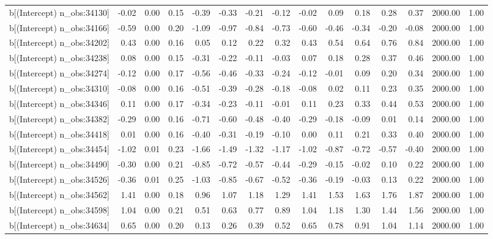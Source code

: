 \begin{table}[ht]
\begin{tabular}{rrrrrrrrrrrrrrr}
  b[(Intercept) n\_obs:34130] & -0.02 & 0.00 & 0.15 & -0.39 & -0.33 & -0.21 & -0.12 & -0.02 & 0.09 & 0.18 & 0.28 & 0.37 & 2000.00 & 1.00 \\ 
  b[(Intercept) n\_obs:34166] & -0.59 & 0.00 & 0.20 & -1.09 & -0.97 & -0.84 & -0.73 & -0.60 & -0.46 & -0.34 & -0.20 & -0.08 & 2000.00 & 1.00 \\ 
  b[(Intercept) n\_obs:34202] & 0.43 & 0.00 & 0.16 & 0.05 & 0.12 & 0.22 & 0.32 & 0.43 & 0.54 & 0.64 & 0.76 & 0.84 & 2000.00 & 1.00 \\ 
  b[(Intercept) n\_obs:34238] & 0.08 & 0.00 & 0.15 & -0.31 & -0.22 & -0.11 & -0.03 & 0.07 & 0.18 & 0.28 & 0.37 & 0.46 & 2000.00 & 1.00 \\ 
  b[(Intercept) n\_obs:34274] & -0.12 & 0.00 & 0.17 & -0.56 & -0.46 & -0.33 & -0.24 & -0.12 & -0.01 & 0.09 & 0.20 & 0.34 & 2000.00 & 1.00 \\ 
  b[(Intercept) n\_obs:34310] & -0.08 & 0.00 & 0.16 & -0.51 & -0.39 & -0.28 & -0.18 & -0.08 & 0.02 & 0.11 & 0.23 & 0.35 & 2000.00 & 1.00 \\ 
  b[(Intercept) n\_obs:34346] & 0.11 & 0.00 & 0.17 & -0.34 & -0.23 & -0.11 & -0.01 & 0.11 & 0.23 & 0.33 & 0.44 & 0.53 & 2000.00 & 1.00 \\ 
  b[(Intercept) n\_obs:34382] & -0.29 & 0.00 & 0.16 & -0.71 & -0.60 & -0.48 & -0.40 & -0.29 & -0.18 & -0.09 & 0.01 & 0.14 & 2000.00 & 1.00 \\ 
  b[(Intercept) n\_obs:34418] & 0.01 & 0.00 & 0.16 & -0.40 & -0.31 & -0.19 & -0.10 & 0.00 & 0.11 & 0.21 & 0.33 & 0.40 & 2000.00 & 1.00 \\ 
  b[(Intercept) n\_obs:34454] & -1.02 & 0.01 & 0.23 & -1.66 & -1.49 & -1.32 & -1.17 & -1.02 & -0.87 & -0.72 & -0.57 & -0.40 & 2000.00 & 1.00 \\ 
  b[(Intercept) n\_obs:34490] & -0.30 & 0.00 & 0.21 & -0.85 & -0.72 & -0.57 & -0.44 & -0.29 & -0.15 & -0.02 & 0.10 & 0.22 & 2000.00 & 1.00 \\ 
  b[(Intercept) n\_obs:34526] & -0.36 & 0.01 & 0.25 & -1.03 & -0.85 & -0.67 & -0.52 & -0.36 & -0.19 & -0.03 & 0.13 & 0.22 & 2000.00 & 1.00 \\ 
  b[(Intercept) n\_obs:34562] & 1.41 & 0.00 & 0.18 & 0.96 & 1.07 & 1.18 & 1.29 & 1.41 & 1.53 & 1.63 & 1.76 & 1.87 & 2000.00 & 1.00 \\ 
  b[(Intercept) n\_obs:34598] & 1.04 & 0.00 & 0.21 & 0.51 & 0.63 & 0.77 & 0.89 & 1.04 & 1.18 & 1.30 & 1.44 & 1.56 & 2000.00 & 1.00 \\ 
  b[(Intercept) n\_obs:34634] & 0.65 & 0.00 & 0.20 & 0.13 & 0.26 & 0.39 & 0.52 & 0.65 & 0.78 & 0.91 & 1.04 & 1.14 & 2000.00 & 1.00 \\ 

\end{tabular}
\end{table}
